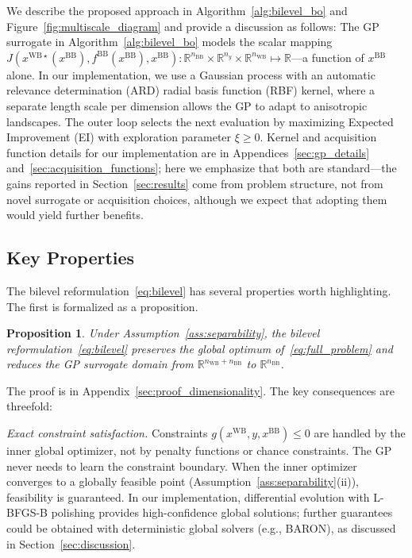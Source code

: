 \documentclass[12pt,a4paper]{article}%
\theoremstyle{plain}%
\newtheorem{proposition}[theorem]{Proposition}%
\theoremstyle{remark}%
\theoremstyle{definition}%
\def\WB{\mathrm{WB}}
\def\BB{\mathrm{BB}}
\begin{document}
We describe the proposed approach in Algorithm~\ref{alg:bilevel_bo} and Figure~\ref{fig:multiscale_diagram} and provide a discussion as follows: The GP surrogate in Algorithm~\ref{alg:bilevel_bo} models the scalar mapping $J(x^{\WB\star}(x^{\BB}), f^{\BB}(x^{\BB}), x^{\BB}):\mathbb{R}^{n_\BB} \times \mathbb{R}^{n_y} \times \mathbb{R}^{n_\WB} \mapsto \mathbb{R}$---a function of $x^{\BB}$ alone. In our implementation, we use a Gaussian process with an automatic relevance determination (ARD) radial basis function (RBF) kernel, where a separate length scale per dimension allows the GP to adapt to anisotropic landscapes. The outer loop selects the next evaluation by maximizing Expected Improvement (EI) with exploration parameter $\xi \geq 0$. Kernel and acquisition function details for our implementation are in Appendices~\ref{sec:gp_details} and~\ref{sec:acquisition_functions}; here we emphasize that both are standard---the gains reported in Section~\ref{sec:results} come from problem structure, not from novel surrogate or acquisition choices, although we expect that adopting them would yield further benefits.

\subsection{Key Properties}\label{subsec:key_properties}

The bilevel reformulation~\eqref{eq:bilevel} has several properties worth highlighting. The first is formalized as a proposition.

\begin{proposition}\label{prop:dimensionality}
Under Assumption~\ref{ass:separability}, the bilevel reformulation~\eqref{eq:bilevel} preserves the global optimum of~\eqref{eq:full_problem} and reduces the GP surrogate domain from $\mathbb{R}^{n_{\WB}+n_{\BB}}$ to $\mathbb{R}^{n_{\BB}}$.
\end{proposition}

\noindent The proof is in Appendix~\ref{sec:proof_dimensionality}. The key consequences are threefold:

\emph{Exact constraint satisfaction.} Constraints $g(x^{\WB}, y, x^{\BB}) \leq 0$ are handled by the inner global optimizer, not by penalty functions or chance constraints. The GP never needs to learn the constraint boundary. When the inner optimizer converges to a globally feasible point (Assumption~\ref{ass:separability}(ii)), feasibility is guaranteed. In our implementation, differential evolution with L-BFGS-B polishing provides high-confidence global solutions; further guarantees could be obtained with deterministic global solvers (e.g., BARON), as discussed in Section~\ref{sec:discussion}.
\end{document}
